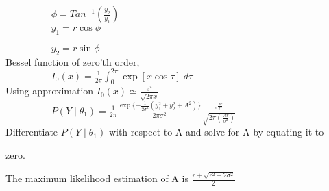 \documentclass[]{article}
\begin{document}
$\hspace{2cm} \phi  = Tan^{-1}(\frac{y_{2}}{y_{1}})$\\

$\hspace{2cm} y_{1} = r\cos \phi$

$\hspace{2cm} y_{2} = r\sin\phi$\\

Bessel function of zero'th order,\\

$\hspace{2cm} I_{0}(x) = \frac{1}{2\pi} \int_{0}^{2\pi} \exp[x\cos \tau] \;d\tau $\\

Using approximation $I_{0}(x) \simeq \frac{e^{x}}{\sqrt{2\pi x}}$\\

$ \hspace{2cm}P(Y\mid \theta_{1}) = \frac{1}{2\pi} \frac{\exp\{-\frac{1}{2\sigma^{2}}(y_{1}^{2} + y_{2}^{2} + A^{2})\}}{2\pi \sigma^{2}}  \frac{e^{\frac{Ar}{\sigma^{2}}}}{\sqrt{2\pi(\frac{Ar}{\sigma^{2}})}}$\\

Differentiate $P(Y\mid \theta_{1})$ with respect to A and solve for A by equating it to 

zero.

The maximum likelihood estimation of A is $\frac{r+\sqrt{r^{2} - 2\sigma^{2}}}{2}$
\end{document}
